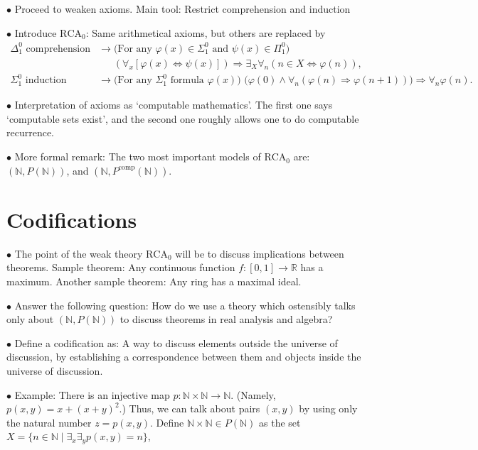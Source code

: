 \documentclass{article}
\theoremstyle{nonumberplain}
\newcommand{\N}{\mathbb{N}}
\newcommand{\R}{\mathbb{R}}
\newcommand{\RCA}{\mathrm{RCA}}
\newcommand\point[1]{\noindent \hspace{\labelsep} $\bullet$ #1 \smallskip}
\newcommand\timestamp[1]{}
\begin{document}
\timestamp{10 minutes}

\point{Proceed to weaken axioms. Main tool: Restrict comprehension and induction}

\point{Introduce $\RCA_0$: Same arithmetical axioms, but others are replaced by}
\begin{equation}
\begin{aligned}
\text{$\Delta^0_1$ comprehension} &\rightarrow \text{(For any $\varphi(x) \in \Sigma^0_1$ and $\psi(x) \in \Pi^0_1$)}\\
&\mathrel{\phantom{\rightarrow}} (\forall_x [\varphi(x) \Leftrightarrow \psi(x)]) \Rightarrow \exists_X \forall_n (n \in X \Leftrightarrow \varphi(n)),\\
\text{$\Sigma^0_1$ induction} &\rightarrow \text{(For any $\Sigma^0_1$ formula $\varphi(x)$) } \big(\varphi(0) \land \forall_n (\varphi(n) \Rightarrow \varphi(n+1)) \big) \Rightarrow \forall_n \varphi(n).
\end{aligned}
\end{equation}

\point{Interpretation of axioms as `computable mathematics'. The first one says `computable sets exist', and the second one roughly allows one to do computable recurrence.}

\point{More formal remark: The two most important models of $\RCA_0$ are: $(\N, P(\N))$, and $(\N, P^{\text{comp}}(\N))$.}

\timestamp{15 minutes}

\section{Codifications}

\point{The point of the weak theory $\RCA_0$ will be to discuss implications between theorems. Sample theorem: Any continuous function $f \colon [0,1] \to \R$ has a maximum. Another sample theorem: Any ring has a maximal ideal.}

\point{Answer the following question: How do we use a theory which ostensibly talks only about $(\N,P(\N))$ to discuss theorems in real analysis and algebra?}

\point{Define a codification as: A way to discuss elements outside the universe of discussion, by establishing a correspondence between them and objects inside the universe of discussion.}

\point{Example: There is an injective map $p \colon \N \times \N \to \N$. (Namely, $p(x,y) = x + (x+y)^2$.) Thus, we can talk about pairs $(x,y)$ by using only the natural number $z = p(x,y)$. Define $\N \times \N \in P(\N)$ as the set $X = \{n \in \N \mid \exists_x \exists_y p(x,y) = n\}$,}
\end{document}
